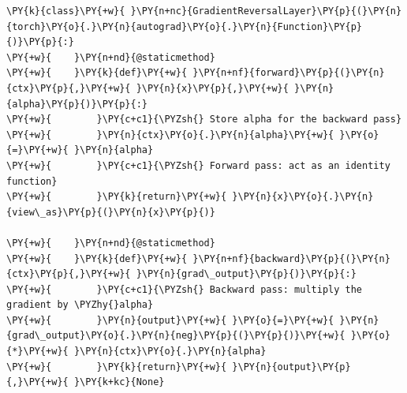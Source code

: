 \begin{Verbatim}[label=\makebox{\url{https://github.com/lucabaldini/cmepda/tree/master/slides/latex/snippets/gradient_reversal.py}},commandchars=\\\{\}]
\PY{k}{class}\PY{+w}{ }\PY{n+nc}{GradientReversalLayer}\PY{p}{(}\PY{n}{torch}\PY{o}{.}\PY{n}{autograd}\PY{o}{.}\PY{n}{Function}\PY{p}{)}\PY{p}{:}
\PY{+w}{    }\PY{n+nd}{@staticmethod}
\PY{+w}{    }\PY{k}{def}\PY{+w}{ }\PY{n+nf}{forward}\PY{p}{(}\PY{n}{ctx}\PY{p}{,}\PY{+w}{ }\PY{n}{x}\PY{p}{,}\PY{+w}{ }\PY{n}{alpha}\PY{p}{)}\PY{p}{:}
\PY{+w}{        }\PY{c+c1}{\PYZsh{} Store alpha for the backward pass}
\PY{+w}{        }\PY{n}{ctx}\PY{o}{.}\PY{n}{alpha}\PY{+w}{ }\PY{o}{=}\PY{+w}{ }\PY{n}{alpha}
\PY{+w}{        }\PY{c+c1}{\PYZsh{} Forward pass: act as an identity function}
\PY{+w}{        }\PY{k}{return}\PY{+w}{ }\PY{n}{x}\PY{o}{.}\PY{n}{view\_as}\PY{p}{(}\PY{n}{x}\PY{p}{)}

\PY{+w}{    }\PY{n+nd}{@staticmethod}
\PY{+w}{    }\PY{k}{def}\PY{+w}{ }\PY{n+nf}{backward}\PY{p}{(}\PY{n}{ctx}\PY{p}{,}\PY{+w}{ }\PY{n}{grad\_output}\PY{p}{)}\PY{p}{:}
\PY{+w}{        }\PY{c+c1}{\PYZsh{} Backward pass: multiply the gradient by \PYZhy{}alpha}
\PY{+w}{        }\PY{n}{output}\PY{+w}{ }\PY{o}{=}\PY{+w}{ }\PY{n}{grad\_output}\PY{o}{.}\PY{n}{neg}\PY{p}{(}\PY{p}{)}\PY{+w}{ }\PY{o}{*}\PY{+w}{ }\PY{n}{ctx}\PY{o}{.}\PY{n}{alpha}
\PY{+w}{        }\PY{k}{return}\PY{+w}{ }\PY{n}{output}\PY{p}{,}\PY{+w}{ }\PY{k+kc}{None}
\end{Verbatim}